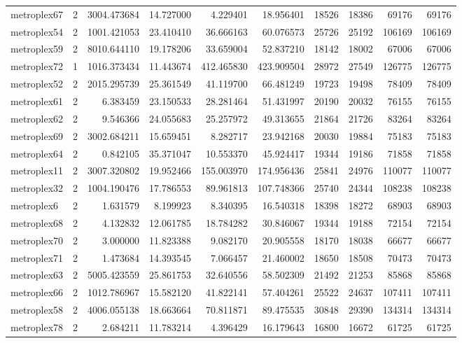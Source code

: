 \begin{longtable}{|l|r|r|r|r|r|r|r|r|r|}
metroplex67 & 2 & 3004.473684 & 14.727000 & 4.229401 & 18.956401 & 18526 & 18386 & 69176 & 69176 \\
metroplex54 & 2 & 1001.421053 & 23.410410 & 36.666163 & 60.076573 & 25726 & 25192 & 106169 & 106169 \\
metroplex59 & 2 & 8010.644110 & 19.178206 & 33.659004 & 52.837210 & 18142 & 18002 & 67006 & 67006 \\
metroplex72 & 1 & 1016.373434 & 11.443674 & 412.465830 & 423.909504 & 28972 & 27549 & 126775 & 126775 \\
metroplex52 & 2 & 2015.295739 & 25.361549 & 41.119700 & 66.481249 & 19723 & 19498 & 78409 & 78409 \\
metroplex61 & 2 & 6.383459 & 23.150533 & 28.281464 & 51.431997 & 20190 & 20032 & 76155 & 76155 \\
metroplex62 & 2 & 9.546366 & 24.055683 & 25.257972 & 49.313655 & 21864 & 21726 & 83264 & 83264 \\
metroplex69 & 2 & 3002.684211 & 15.659451 & 8.282717 & 23.942168 & 20030 & 19884 & 75183 & 75183 \\
metroplex64 & 2 & 0.842105 & 35.371047 & 10.553370 & 45.924417 & 19344 & 19186 & 71858 & 71858 \\
metroplex11 & 2 & 3007.320802 & 19.952466 & 155.003970 & 174.956436 & 25841 & 24976 & 110077 & 110077 \\
metroplex32 & 2 & 1004.190476 & 17.786553 & 89.961813 & 107.748366 & 25740 & 24344 & 108238 & 108238 \\
metroplex6 & 2 & 1.631579 & 8.199923 & 8.340395 & 16.540318 & 18398 & 18272 & 68903 & 68903 \\
metroplex68 & 2 & 4.132832 & 12.061785 & 18.784282 & 30.846067 & 19344 & 19188 & 72154 & 72154 \\
metroplex70 & 2 & 3.000000 & 11.823388 & 9.082170 & 20.905558 & 18170 & 18038 & 66677 & 66677 \\
metroplex71 & 2 & 1.473684 & 14.393545 & 7.066457 & 21.460002 & 18650 & 18508 & 70473 & 70473 \\
metroplex63 & 2 & 5005.423559 & 25.861753 & 32.640556 & 58.502309 & 21492 & 21253 & 85868 & 85868 \\
metroplex66 & 2 & 1012.786967 & 15.582120 & 41.822141 & 57.404261 & 25522 & 24637 & 107411 & 107411 \\
metroplex58 & 2 & 4006.055138 & 18.663664 & 70.811871 & 89.475535 & 30848 & 29390 & 134314 & 134314 \\
metroplex78 & 2 & 2.684211 & 11.783214 & 4.396429 & 16.179643 & 16800 & 16672 & 61725 & 61725 \\

\end{longtable}
